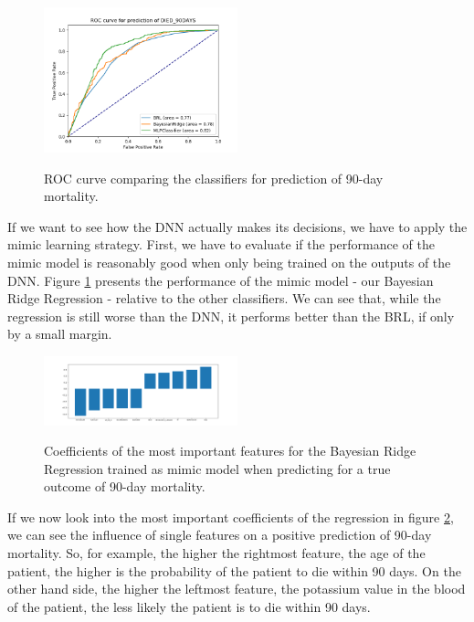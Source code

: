 \documentclass[conference,compsoc]{IEEEtran}
\begin{document}
\begin{figure}[h]
	\includegraphics[width=0.5\textwidth]{ROC_DIED_90DAYS.png}
	\label{fig:mortalityROC}
	\caption{ROC curve comparing the classifiers for prediction of 90-day mortality.}
\end{figure}

If we want to see how the DNN actually makes its decisions, we have to apply the mimic learning strategy.
First, we have to evaluate if the performance of the mimic model is reasonably good when only being trained on the outputs of the DNN.
Figure \ref{fig:mortalityROC} presents the performance of the mimic model - our Bayesian Ridge Regression - relative to the other classifiers.
We can see that, while the regression is still worse than the DNN, it performs better than the BRL, if only by a small margin. \\

\begin{figure}[h]
	\includegraphics[width=0.5\textwidth]{coef_DIED_90DAYS.png}
	\label{fig:mortalityCOEF}
	\caption{Coefficients of the most important features for the Bayesian Ridge Regression trained as mimic model when predicting for a true outcome of 90-day mortality.}
\end{figure}

If we now look into the most important coefficients of the regression in figure \ref{fig:mortalityCOEF}, we can see the influence of single features on a positive prediction of 90-day mortality.
So, for example, the higher the rightmost feature, the age of the patient, the higher is the probability of the patient to die within 90 days.
On the other hand side, the higher the leftmost feature, the potassium value in the blood of the patient, the less likely the patient is to die within 90 days.
\end{document}
